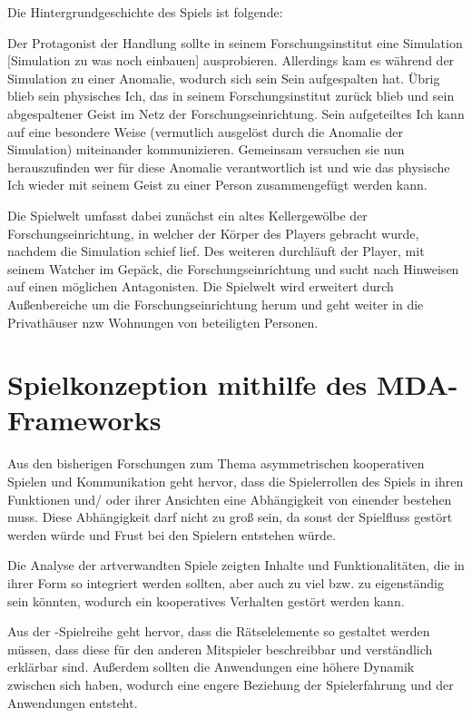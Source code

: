Die Hintergrundgeschichte des Spiels ist folgende:

Der Protagonist der Handlung sollte in seinem Forschungsinstitut eine Simulation [Simulation zu was noch einbauen] ausprobieren. Allerdings kam es während der Simulation zu einer Anomalie, wodurch sich sein Sein aufgespalten hat. Übrig blieb sein physisches Ich, das in seinem Forschungsinstitut zurück blieb und sein abgespaltener Geist im Netz der Forschungseinrichtung. Sein aufgeteiltes Ich kann auf eine besondere Weise (vermutlich ausgelöst durch die Anomalie der Simulation) miteinander kommunizieren. Gemeinsam versuchen sie nun herauszufinden wer für diese Anomalie verantwortlich ist und wie das physische Ich wieder mit seinem Geist zu einer Person zusammengefügt werden kann.


Die Spielwelt umfasst dabei zunächst ein altes Kellergewölbe der Forschungseinrichtung, in welcher der Körper des Players gebracht wurde, nachdem die Simulation schief lief. Des weiteren durchläuft der Player, mit seinem Watcher im Gepäck, die Forschungseinrichtung und sucht nach Hinweisen auf einen möglichen Antagonisten. Die Spielwelt wird erweitert durch Außenbereiche um die Forschungseinrichtung herum und geht weiter in die Privathäuser nzw Wohnungen von beteiligten Personen.

\section{Spielkonzeption mithilfe des MDA-Frameworks}
Aus den bisherigen Forschungen zum Thema asymmetrischen kooperativen Spielen und Kommunikation geht hervor, dass die Spielerrollen des Spiels in ihren Funktionen und/ oder ihrer Ansichten eine Abhängigkeit von einender bestehen muss. Diese Abhängigkeit darf nicht zu groß sein, da sonst der Spielfluss gestört werden würde und Frust bei den Spielern entstehen würde. 

Die Analyse der artverwandten Spiele zeigten Inhalte und Funktionalitäten, die in ihrer Form so integriert werden sollten, aber auch zu viel bzw. zu eigenständig sein könnten, wodurch ein kooperatives Verhalten gestört werden kann.

Aus der -Spielreihe geht hervor, dass die Rätselelemente so gestaltet werden müssen, dass diese für den anderen Mitspieler beschreibbar und verständlich erklärbar sind. Außerdem sollten die Anwendungen eine höhere Dynamik zwischen sich haben, wodurch eine engere Beziehung der Spielerfahrung und der Anwendungen entsteht. 


